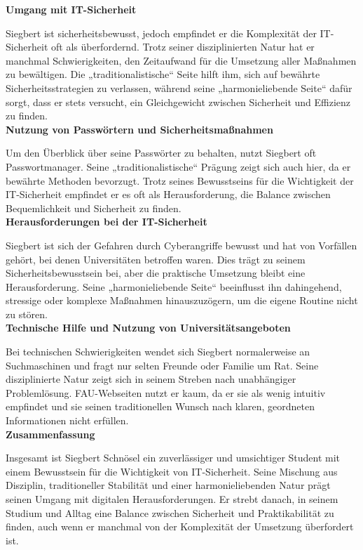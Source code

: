 \documentclass[german,report]{i1thesis}
\begin{document}
\textbf{Umgang mit IT-Sicherheit}

Siegbert ist sicherheitsbewusst, jedoch empfindet er die Komplexität der IT-Sicherheit oft als überfordernd. Trotz seiner disziplinierten Natur hat er manchmal Schwierigkeiten, den Zeitaufwand für die Umsetzung aller Maßnahmen zu bewältigen. Die „traditionalistische“ Seite hilft ihm, sich auf bewährte Sicherheitsstrategien zu verlassen, während seine „harmonieliebende Seite“ dafür sorgt, dass er stets versucht, ein Gleichgewicht zwischen Sicherheit und Effizienz zu finden.\\

\textbf{Nutzung von Passwörtern und Sicherheitsmaßnahmen}

Um den Überblick über seine Passwörter zu behalten, nutzt Siegbert oft Passwortmanager. Seine „traditionalistische“ Prägung zeigt sich auch hier, da er bewährte Methoden bevorzugt. Trotz seines Bewusstseins für die Wichtigkeit der IT-Sicherheit empfindet er es oft als Herausforderung, die Balance zwischen Bequemlichkeit und Sicherheit zu finden.\\

\textbf{Herausforderungen bei der IT-Sicherheit}

Siegbert ist sich der Gefahren durch Cyberangriffe bewusst und hat von Vorfällen gehört, bei denen Universitäten betroffen waren. Dies trägt zu seinem Sicherheitsbewusstsein bei, aber die praktische Umsetzung bleibt eine Herausforderung. Seine „harmonieliebende Seite“ beeinflusst ihn dahingehend, stressige oder komplexe Maßnahmen hinauszuzögern, um die eigene Routine nicht zu stören.\\

\textbf{Technische Hilfe und Nutzung von Universitätsangeboten}

Bei technischen Schwierigkeiten wendet sich Siegbert normalerweise an Suchmaschinen und fragt nur selten Freunde oder Familie um Rat. Seine disziplinierte Natur zeigt sich in seinem Streben nach unabhängiger Problemlösung. FAU-Webseiten nutzt er kaum, da er sie als wenig intuitiv empfindet und sie seinen traditionellen Wunsch nach klaren, geordneten Informationen nicht erfüllen.\\

\textbf{Zusammenfassung}

Insgesamt ist Siegbert Schnösel ein zuverlässiger und umsichtiger Student mit einem Bewusstsein für die Wichtigkeit von IT-Sicherheit. Seine Mischung aus Disziplin, traditioneller Stabilität und einer harmonieliebenden Natur prägt seinen Umgang mit digitalen Herausforderungen. Er strebt danach, in seinem Studium und Alltag eine Balance zwischen Sicherheit und Praktikabilität zu finden, auch wenn er manchmal von der Komplexität der Umsetzung überfordert ist.
\end{document}

